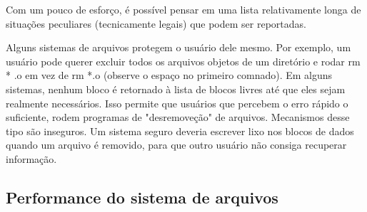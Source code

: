 \documentclass{article}
\begin{document}
Com um pouco de esforço, é possível pensar em uma lista relativamente longa de situações peculiares (tecnicamente legais) que podem ser reportadas.

Alguns sistemas de arquivos protegem o usuário dele mesmo. Por exemplo, um usuário pode querer excluir todos os arquivos objetos de um diretório e rodar rm * .o em vez de rm *.o (observe o espaço no primeiro comnado). Em alguns sistemas, nenhum bloco é retornado à lista de blocos livres até que eles sejam realmente necessários. Isso permite que usuários que percebem o erro rápido o suficiente, rodem programas de "desremoveção" de arquivos. Mecanismos desse tipo são inseguros. Um sistema seguro deveria escrever lixo nos blocos de dados quando um arquivo é removido, para que outro usuário não consiga recuperar informação.

\subsection{Performance do sistema de arquivos}
\end{document}
